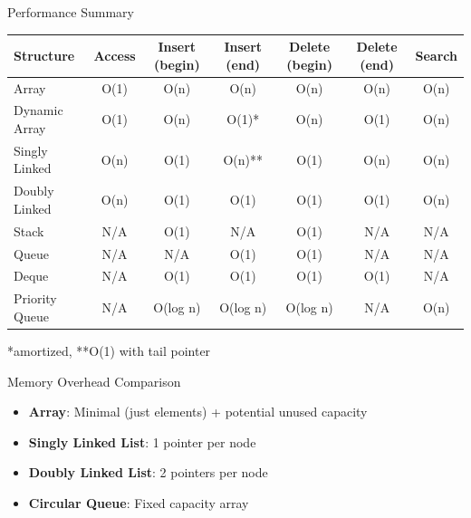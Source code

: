 \documentclass[aspectratio=169,xcolor=dvipsnames]{beamer}
\begin{document}
\begin{frame}{Performance Summary}
  \begin{center}
    \small
    \begin{tabular}{l|c|c|c|c|c|c}
      \toprule
      \textbf{Structure} & \textbf{Access} & \textbf{Insert (begin)} & \textbf{Insert (end)} & \textbf{Delete (begin)} & \textbf{Delete (end)} & \textbf{Search} \\
      \midrule
      Array & O(1) & O(n) & O(n) & O(n) & O(n) & O(n) \\
      Dynamic Array & O(1) & O(n) & O(1)* & O(n) & O(1) & O(n) \\
      Singly Linked & O(n) & O(1) & O(n)** & O(1) & O(n) & O(n) \\
      Doubly Linked & O(n) & O(1) & O(1) & O(1) & O(1) & O(n) \\
      Stack & N/A & O(1) & N/A & O(1) & N/A & N/A \\
      Queue & N/A & N/A & O(1) & O(1) & N/A & N/A \\
      Deque & N/A & O(1) & O(1) & O(1) & O(1) & N/A \\
      Priority Queue & N/A & O(log n) & O(log n) & O(log n) & N/A & O(n) \\
      \bottomrule
    \end{tabular}
  \end{center}

  \vspace{0.2cm}
  \tiny{*amortized, **O(1) with tail pointer}

  \vspace{0.5cm}

  \begin{block}{Memory Overhead Comparison}
    \begin{itemize}
      \item \textbf{Array}: Minimal (just elements) + potential unused capacity
      \item \textbf{Singly Linked List}: 1 pointer per node
      \item \textbf{Doubly Linked List}: 2 pointers per node
      \item \textbf{Circular Queue}: Fixed capacity array
    \end{itemize}
  \end{block}
\end{frame}
\end{document}

